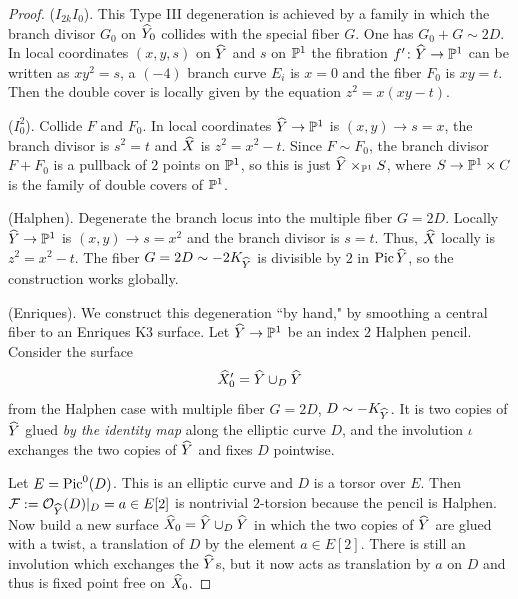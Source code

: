 \documentclass{amsart}
\begin{document}
\begin{proof}
  ($I_{2k}I_0$). This Type III degeneration is achieved by a family
  in which the branch divisor $G_0$ on ${\widehat Y}_0$ collides with the special
  fiber $G$. One has $G_0 + G\sim 2D$. In local coordinates $(x,y,s)$
  on ${\widehat Y}$ and $s$ on ${\mathbb P}^1$ the fibration $f'\colon {\widehat Y}\to{\mathbb P}^1$ can be
  written as $xy^2=s$, a $(-4)$ branch curve $E_i$ is $x=0$ and the
  fiber $F_0$ is $xy=t$. Then the double cover is locally given by the
  equation $z^2= x(xy-t)$.

  \smallskip
  
  ($I_0^2$). Collide $F$ and $F_0$.  In local coordinates
  ${\widehat Y}\to{\mathbb P}^1$ is $(x,y)\to s=x$, the branch divisor is $s^2=t$ and ${\widehat X}$
  is $z^2=x^2-t$. Since $F\sim F_0$, the branch divisor $F+F_0$ is a
  pullback of $2$ points on ${\mathbb P}^1$, so this is just
  ${\widehat Y}\times_{{\mathbb P}^1} S$, where $S\to {\mathbb P}^1\times C$ is the family of
  double covers of ${\mathbb P}^1$.

  \smallskip
  
  (Halphen). Degenerate the branch locus into the multiple
  fiber $G=2D$. Locally ${\widehat Y}\to{\mathbb P}^1$ is
  $(x,y)\to s=x^2$ and the branch divisor is $s=t$. Thus, ${\widehat X}$ locally
  is $z^2=x^2-t$. The fiber $G=2D\sim -2K_{\widehat Y}$ is divisible by $2$ in
  $\operatorname{Pic} {\widehat Y}$, so the construction works globally.

  \smallskip
  
  (Enriques). We construct this degeneration ``by hand," by smoothing
  a central fiber to an Enriques K3 surface. Let ${\widehat Y}\to{\mathbb P}^1$ be an 
  index $2$ Halphen pencil. Consider the surface $${\widehat X}'_0={\widehat Y}\cup_D {\widehat Y}$$
  from the Halphen case with multiple fiber $G=2D$, $D\sim -K_{{\widehat Y}}$. It is two copies of
  ${\widehat Y}$ glued {\it by the identity map} along the elliptic curve $D$,
  and the involution $\iota$ exchanges the two copies of ${\widehat Y}$ and fixes $D$ pointwise.

  Let $E=\operatorname{Pic}^0(D)$. This is an elliptic curve and $D$ is a torsor
  over $E$. Then ${\mathcal F}:={\mathcal O}_{{\widehat Y}}(D)|_D=a\in E[2]$ is nontrivial
  $2$-torsion because the pencil is Halphen.
  Now build a new surface ${\widehat X}_0= {\widehat Y}\cup_D {\widehat Y}$ in which the
  two copies of ${\widehat Y}$ are glued with a twist, a translation of $D$ by 
  the element $a\in E[2]$. There is still an involution which exchanges
  the ${\widehat Y}$s, but it now acts as translation by $a$ on $D$
  and thus is fixed point free on ${\widehat X}_0$.
  

\end{proof}
\end{document}
